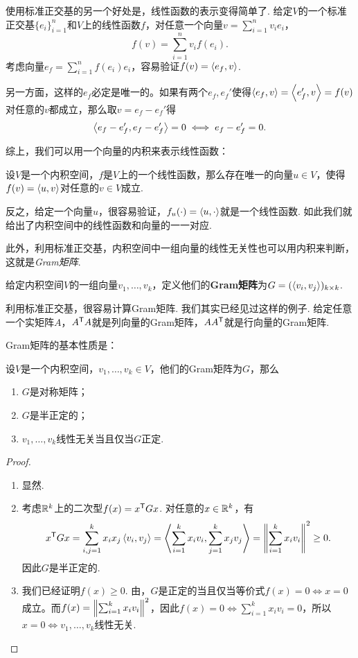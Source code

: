 使用标准正交基的另一个好处是，线性函数的表示变得简单了. 给定$V$的一个标准正交基$\{e_i\}_{i=1}^n$和$V$上的线性函数$f$，对任意一个向量$v=\sum_{i=1}^nv_ie_i$，
\[f(v)=\sum_{i=1}^nv_if(e_i).\]
考虑向量$e_f=\sum_{i=1}^nf(e_i)e_i$，容易验证$f(v)=\left\langle{e_f},{v}\right\rangle$. 

另一方面，这样的$e_f$必定是唯一的。如果有两个$e_f,e_f'$使得$\left\langle{e_f},{v}\right\rangle=\left\langle{e_f'},{v}\right\rangle=f(v)$对任意的$v$都成立，那么取$v=e_f-e_f'$得
\[\left\langle{e_f-e_f'},{e_f-e_f'}\right\rangle=0\iff e_f-e_f'=0.\]

综上，我们可以用一个向量的内积来表示线性函数：

\begin{theorem}[Riesz表示定理]\label{thm:riesz}
设$V$是一个内积空间，$f$是$V$上的一个线性函数，那么存在唯一的向量$u\in V$，使得$f(v)=\left\langle{u},{v}\right\rangle$对任意的$v\in V$成立.
\end{theorem}

反之，给定一个向量$u$，很容易验证，$f_u(\cdot)=\left\langle{u},{\cdot}\right\rangle$就是一个线性函数. 如此我们就给出了内积空间中的线性函数和向量的一一对应. 

此外，利用标准正交基，内积空间中一组向量的线性无关性也可以用内积来判断，这就是\emph{Gram矩阵}. 

\begin{definition}[Gram矩阵]\label{def:gram-matrix}
给定内积空间$V$的一组向量$v_1,\dots,v_k$，定义他们的\textbf{Gram矩阵}为$G=(\left\langle{v_i},{v_j}\right\rangle)_{k\times k}$. 
\end{definition}

利用标准正交基，很容易计算Gram矩阵. 我们其实已经见过这样的例子. 给定任意一个实矩阵$A$，$A^{\mathsf{T}} A$就是列向量的Gram矩阵，$AA^{\mathsf{T}}$就是行向量的Gram矩阵.

Gram矩阵的基本性质是：

\begin{proposition}\label{prop:gram}
设$V$是一个内积空间，$v_1,\dots,v_k\in V$，他们的Gram矩阵为$G$，那么
\begin{enumerate}
    \item $G$是对称矩阵；
    \item $G$是半正定的；
    \item $v_1,\dots,v_k$线性无关当且仅当$G$正定.
\end{enumerate}
\end{proposition}
\begin{proof}
\begin{enumerate}
    \item 显然.
    \item 考虑$\mathbb{R}^k$上的二次型$f(x)=x^{\mathsf{T}} Gx$. 对任意的$x\in\mathbb{R}^k$，有
    \[
        x^{\mathsf{T}} G x=\sum_{i,j=1}^kx_ix_j\left\langle{v_i},{v_j}\right\rangle
        =\left\langle{\sum_{i=1}^kx_iv_i},{\sum_{j=1}^kx_jv_j}\right\rangle
        =\left\|\sum_{i=1}^kx_iv_i\right\|^2\geq 0.
    \]
    因此$G$是半正定的.
    \item 我们已经证明$f(x)\geq 0$. 由，$G$是正定的当且仅当等价式$f(x)=0\iff x=0$成立。而$f(x)=\left\|\sum_{i=1}^kx_iv_i\right\|^2$，因此$f(x)=0\iff \sum_{i=1}^kx_iv_i=0$，所以$x=0\iff v_1,\dots,v_k$线性无关.
\end{enumerate}
\end{proof}

